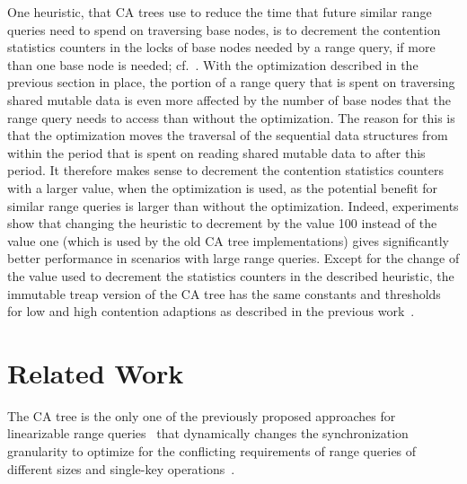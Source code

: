 \documentclass[a4paper,UKenglish]{oasics-v2016}
\begin{document}
One heuristic, that CA trees use to reduce the time that future similar range queries need to spend on traversing base nodes, is to decrement the contention statistics counters in the locks of base nodes needed by a range query, if more than one base node is needed; cf.~\cite{CATreeLCPC}.
With the optimization described in the previous section in place, the portion of a range query that is spent on traversing shared mutable data is even more affected by the number of base nodes that the range query needs to access than without the optimization.
The reason for this is that the optimization moves the traversal of the sequential data structures from within the period that is spent on reading shared mutable data to after this period. 
It therefore makes sense to decrement the contention statistics counters with a larger value, when the optimization is used, as the potential benefit for similar range queries is larger than without the optimization.
Indeed, experiments show that changing the heuristic to decrement by the value 100 instead of the value one (which is used by the old CA tree implementations) gives significantly better performance in scenarios with large range queries.
Except for the change of the value used to decrement the statistics counters in the described heuristic, the immutable treap version of the CA tree has the same constants and thresholds for low and high contention adaptions as described in the previous work~\cite{CATreeLCPC}.



\section{Related Work\label{sec:related}}
The CA tree is the only one of the previously proposed approaches for linearizable range queries~\cite{bronson2010practical,RangeQKArySeachTree,AvniLeaplist,CFRangeQueries,ChatterjeeLFRangeQueries,BasinKiWi} that dynamically changes the synchronization granularity to optimize for the conflicting requirements of range queries of different sizes and single-key operations~\cite{CATreeLCPC}.
\end{document}
